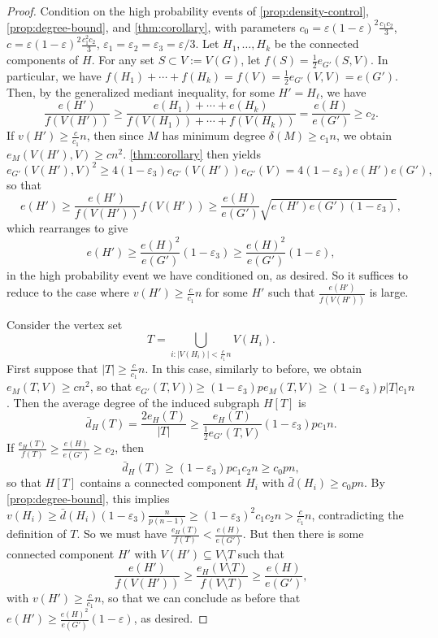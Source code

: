 \documentclass[10pt,a4paper]{amsart}
\begin{document}
\begin{proof}
    Condition on the high probability events of \cref{prop:density-control}, \cref{prop:degree-bound}, and \cref{thm:corollary}, with parameters $c_0=\varepsilon(1-\varepsilon)^2\frac{c_1 c_2}{3}$, $c=\varepsilon(1-\varepsilon)^2\frac{c_1^2 c_2}{3}$, $\varepsilon_1=\varepsilon_2=\varepsilon_3=\varepsilon/3$. Let $H_1,\dots, H_k$ be the connected components of $H$. For any set $S\subset V:=V(G)$, let $f(S)=\frac12e_{G'}(S, V)$. In particular, we have $f(H_1)+\cdots+f(H_k)=f(V)=\frac{1}{2}e_{G'}(V,V)=e(G')$. 
    Then, by the generalized mediant inequality, for some $H'=H_\ell$, we have
    \[\frac{e(H')}{f(V(H'))} \ge \frac{e(H_1)+\cdots+e(H_k)}{f(V(H_1))+\cdots+f(V(H_k))} = \frac{e(H)}{e(G')}\ge c_2.\] 
    If $v(H')\ge \frac{c}{c_1}n$, then since $M$ has minimum degree $\delta(M)\ge c_1 n$, we obtain $e_M(V(H'),V)\ge cn^2$. \cref{thm:corollary} then yields
    \[
        e_{G'}(V(H'),V)^2\ge 4(1-\varepsilon_3)e_{G'}(V(H'))e_{G'}(V)=4(1-\varepsilon_3)e(H')e(G'),
    \]
    so that
    \[
        e(H')\ge \frac{e(H')}{f(V(H'))} f(V(H')) \ge \frac{e(H)}{e(G')}\sqrt{e(H')e(G')(1-\varepsilon_3)},
    \]
    which rearranges to give
	\[e(H')\ge \frac{e(H)^2}{e(G')}(1-\varepsilon_3)\ge \frac{e(H)^2}{e(G')}(1-\varepsilon),\]
    in the high probability event we have conditioned on, as desired. So it suffices to reduce to the case where $v(H')\ge \frac{c}{c_1}n$ for some $H'$ such that $\frac{e(H')}{f(V(H'))}$ is large. 
    
    Consider the vertex set
    \[
        T=\bigcup_{i:|V(H_i)|<\frac{c}{c_1}n}V(H_i).
    \]
    First suppose that $|T|\ge \frac{c}{c_1}n$. In this case, similarly to before, we obtain $e_M(T,V)\ge cn^2$, so that $e_{G'}(T,V))\ge (1-\varepsilon_3)pe_M(T,V)\ge (1-\varepsilon_3)p|T|c_1 n$. Then the average degree of the induced subgraph $H[T]$ is
    \[
        \bar d_{H}(T)=\frac{2e_{H}(T)}{|T|}\ge \frac{e_{H}(T)}{\frac{1}{2}e_{G'}(T,V)}(1-\varepsilon_3)pc_1 n.
    \]
    If $\frac{e_H(T)}{f(T)}\ge \frac{e(H)}{e(G')}\ge c_2$, then
    \[
        \bar d_{H}(T)\ge (1-\varepsilon_3)pc_1 c_2 n \ge c_0 pn,
    \]
    so that $H[T]$ contains a connected component $H_i$ with $\bar d(H_i)\ge c_0 pn$. By \cref{prop:degree-bound}, this implies $v(H_i)\ge \bar d(H_i)(1-\varepsilon_3)\frac{n}{p(n-1)}\ge (1-\varepsilon_3)^2 c_1 c_2 n>\frac{c}{c_1}n$,
    contradicting the definition of $T$. So we must have $\frac{e_H(T)}{f(T)}< \frac{e(H)}{e(G')}$. But then there is some connected component $H'$ with $V(H')\subseteq V\setminus T$ such that
    \[
        \frac{e(H')}{f(V(H'))} \ge \frac{e_{H}(V\setminus T)}{f(V\setminus T)} \ge \frac{e(H)}{e(G')},
    \]
    with $v(H')\ge \frac{c}{c_1}n$, so that we can conclude as before that $e(H')\ge \frac{e(H)^2}{e(G')}(1-\varepsilon)$, as desired.


\end{proof}
\end{document}
